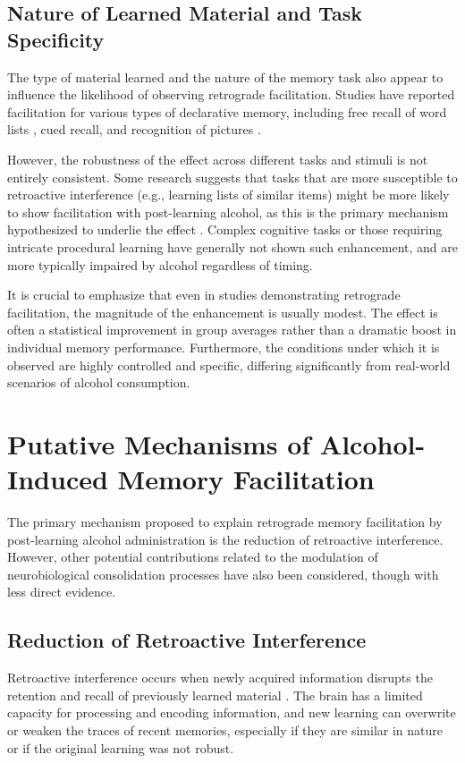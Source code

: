 \documentclass[12pt, a4paper]{article}
\begin{document}
\subsection{Nature of Learned Material and Task Specificity}
The type of material learned and the nature of the memory task also appear to influence the likelihood of observing retrograde facilitation. Studies have reported facilitation for various types of declarative memory, including free recall of word lists \cite{Lamberty1990}, cued recall, and recognition of pictures \cite{Parker1980}.

However, the robustness of the effect across different tasks and stimuli is not entirely consistent. Some research suggests that tasks that are more susceptible to retroactive interference (e.g., learning lists of similar items) might be more likely to show facilitation with post-learning alcohol, as this is the primary mechanism hypothesized to underlie the effect \cite{Duff2009}. Complex cognitive tasks or those requiring intricate procedural learning have generally not shown such enhancement, and are more typically impaired by alcohol regardless of timing.

It is crucial to emphasize that even in studies demonstrating retrograde facilitation, the magnitude of the enhancement is usually modest. The effect is often a statistical improvement in group averages rather than a dramatic boost in individual memory performance. Furthermore, the conditions under which it is observed are highly controlled and specific, differing significantly from real-world scenarios of alcohol consumption.

\section{Putative Mechanisms of Alcohol-Induced Memory Facilitation}
The primary mechanism proposed to explain retrograde memory facilitation by post-learning alcohol administration is the reduction of retroactive interference. However, other potential contributions related to the modulation of neurobiological consolidation processes have also been considered, though with less direct evidence.

\subsection{Reduction of Retroactive Interference}
Retroactive interference occurs when newly acquired information disrupts the retention and recall of previously learned material \cite{Baddeley1997}. The brain has a limited capacity for processing and encoding information, and new learning can overwrite or weaken the traces of recent memories, especially if they are similar in nature or if the original learning was not robust.
\end{document}
